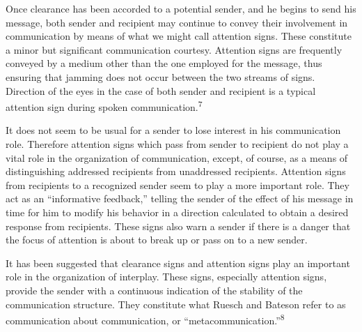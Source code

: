 \documentclass[twoside,symmetric,nobib,justified]{tufte-book}
\begin{document}
Once clearance has been accorded to a potential sender, and he begins to
send his message, both sender and recipient may continue to convey their
involvement in communication by means of what we might call attention
signs. These constitute a minor but significant communication courtesy.
Attention signs are frequently conveyed by a medium other than the one
employed for the message, thus ensuring that jamming does not occur
between the two streams of signs. Direction of the eyes in the case of
both sender and recipient is a typical attention sign during spoken
communication.\textsuperscript{7}

It does not seem to be usual for a sender to lose interest in his
communication role. Therefore attention signs which pass from sender to
recipient do not play a vital role in the organization of communication,
except, of course, as a means of distinguishing addressed recipients
from unaddressed recipients. Attention signs from recipients to a
recognized sender seem to play a more important role. They act as an
``informative feedback,'' telling the sender of the effect of his
message in time for him to modify his behavior in a direction calculated
to obtain
 a desired response from recipients. These signs also warn a
sender if there is a danger that the focus of attention is about to
break up or pass on to a new sender.

It has been suggested that clearance signs and attention signs play an
important role in the organization of interplay. These signs, especially
attention signs, provide the sender with a continuous indication of the
stability of the communication structure. They constitute what Ruesch
and Bateson refer to as communication about communication, or
``metacommunication.''\textsuperscript{8}
\end{document}
